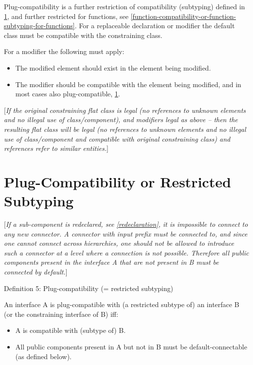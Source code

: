 \documentclass[10pt,a4paper]{report}
\def\doublelabel#1{\label{#1}}
\begin{document}
Plug-compatibility is a further restriction of compatibility (subtyping)
defined in \ref{plug-compatibility-or-restricted-subtyping}, and further restricted for functions, see
\ref{function-compatibility-or-function-subtyping-for-functions}. For a replaceable declaration or modifier the default class
must be compatible with the constraining class.

For a modifier the following must apply:

\begin{itemize}
\item
  The modified element should exist in the element being modified.
\item
  The modifier should be compatible with the element being modified, and
  in most cases also plug-compatible, \ref{plug-compatibility-or-restricted-subtyping}.
\end{itemize}

{[}\emph{If the original constraining flat class is legal (no references
to unknown elements and no illegal use of class/component), and
modifiers legal as above -- then the resulting flat class will be legal
(no references to unknown elements and no illegal use of class/component
and compatible with original constraining class) and references refer to
similar entities.}{]}

\section{Plug-Compatibility or Restricted Subtyping}\doublelabel{plug-compatibility-or-restricted-subtyping}

{[}\emph{If a sub-component is redeclared, see \ref{redeclaration}, it is
impossible to connect to any new connector. A connector with input
prefix must be connected to, and since one cannot connect across
hierarchies, one should not be allowed to introduce such a connector at
a level where a connection is not possible. Therefore all public
components present in the interface A that are not present in B must be
connected by default.}{]}

Definition 5: Plug-compatibility (= restricted subtyping)

An interface A is plug-compatible with (a restricted subtype of) an
interface B (or the constraining interface of B) iff:

\begin{itemize}
\item
  A is compatible with (subtype of) B.
\item
  All public components present in A but not in B must be
  default-connectable (as defined below).
\end{itemize}
\end{document}

